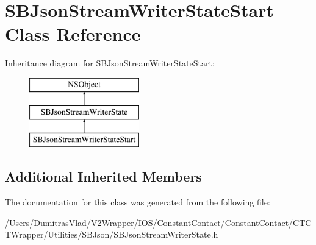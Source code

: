 \hypertarget{interface_s_b_json_stream_writer_state_start}{\section{S\-B\-Json\-Stream\-Writer\-State\-Start Class Reference}
\label{interface_s_b_json_stream_writer_state_start}
}
Inheritance diagram for S\-B\-Json\-Stream\-Writer\-State\-Start\-:\begin{figure}[H]
\begin{center}
\leavevmode
\includegraphics[height=3.000000cm]{interface_s_b_json_stream_writer_state_start}
\end{center}
\end{figure}
\subsection*{Additional Inherited Members}


The documentation for this class was generated from the following file\-:\begin{DoxyCompactItemize}
\item 
/\-Users/\-Dumitras\-Vlad/\-V2\-Wrapper/\-I\-O\-S/\-Constant\-Contact/\-Constant\-Contact/\-C\-T\-C\-T\-Wrapper/\-Utilities/\-S\-B\-Json/S\-B\-Json\-Stream\-Writer\-State.\-h\end{DoxyCompactItemize}
